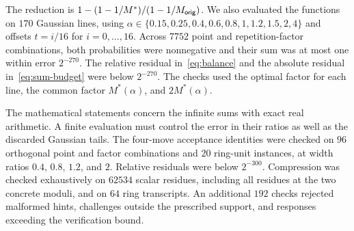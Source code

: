 The reduction is $1-(1-1/M^*)/(1-1/M_{\mathsf{orig}})$. We also evaluated the functions on $170$ Gaussian lines, using $\alpha\in\{0.15,0.25,0.4,0.6,0.8,1,1.2,1.5,2,4\}$ and offsets $t=i/16$ for $i=0,\ldots,16$. Across $7752$ point and repetition-factor combinations, both probabilities were nonnegative and their sum was at most one within error $2^{-270}$. The relative residual in~\cref{eq:balance} and the absolute residual in~\cref{eq:sum-budget} were below $2^{-270}$. The checks used the optimal factor for each line, the common factor $M^*(\alpha)$, and $2M^*(\alpha)$.

The mathematical statements concern the infinite sums with exact real arithmetic. A finite evaluation must control the error in their ratios as well as the discarded Gaussian tails.
The four-move acceptance identities were checked on $96$ orthogonal point and factor combinations and $20$ ring-unit instances, at width ratios $0.4$, $0.8$, $1.2$, and $2$. Relative residuals were below $2^{-300}$. Compression was checked exhaustively on $62534$ scalar residues, including all residues at the two concrete moduli, and on $64$ ring transcripts. An additional $192$ checks rejected malformed hints, challenges outside the prescribed support, and responses exceeding the verification bound.
\FloatBarrier
